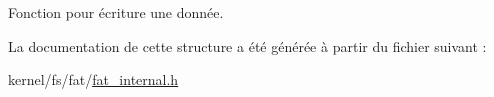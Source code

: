Fonction pour écriture une donnée. 

La documentation de cette structure a été générée à partir du fichier suivant \+:\begin{DoxyCompactItemize}
\item 
kernel/fs/fat/\hyperlink{fat__internal_8h}{fat\+\_\+internal.\+h}\end{DoxyCompactItemize}
